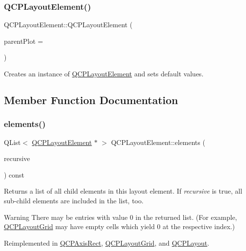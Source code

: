 \subsubsection{\texorpdfstring{Q\+C\+P\+Layout\+Element()}{QCPLayoutElement()}}
{\footnotesize\ttfamily Q\+C\+P\+Layout\+Element\+::\+Q\+C\+P\+Layout\+Element (\begin{DoxyParamCaption}\item[{\hyperlink{class_q_custom_plot}{Q\+Custom\+Plot} $\ast$}]{parent\+Plot = {} }\end{DoxyParamCaption})\hspace{0.3cm}{\ttfamily [explicit]}}

Creates an instance of \hyperlink{class_q_c_p_layout_element}{Q\+C\+P\+Layout\+Element} and sets default values. 

\subsection{Member Function Documentation}
\hypertarget{class_q_c_p_layout_element_a76dec8cb31e498994a944d7647a43309}{}\label{class_q_c_p_layout_element_a76dec8cb31e498994a944d7647a43309} 
\subsubsection{\texorpdfstring{elements()}{elements()}}
{\footnotesize\ttfamily Q\+List$<$ \hyperlink{class_q_c_p_layout_element}{Q\+C\+P\+Layout\+Element} $\ast$ $>$ Q\+C\+P\+Layout\+Element\+::elements (\begin{DoxyParamCaption}\item[{bool}]{recursive }\end{DoxyParamCaption}) const\hspace{0.3cm}{\ttfamily [virtual]}}

Returns a list of all child elements in this layout element. If {\itshape recursive} is true, all sub-\/child elements are included in the list, too.

\begin{DoxyWarning}{Warning}
There may be entries with value 0 in the returned list. (For example, \hyperlink{class_q_c_p_layout_grid}{Q\+C\+P\+Layout\+Grid} may have empty cells which yield 0 at the respective index.) 
\end{DoxyWarning}


Reimplemented in \hyperlink{class_q_c_p_axis_rect_a40c0b3b17eb317ff4d393b7cb9b082a2}{Q\+C\+P\+Axis\+Rect}, \hyperlink{class_q_c_p_layout_grid_a20a745d013de4c89cf5de8004a5a36f7}{Q\+C\+P\+Layout\+Grid}, and \hyperlink{class_q_c_p_layout_adc9ebc73fc215f9cc22796712a251ff4}{Q\+C\+P\+Layout}.

